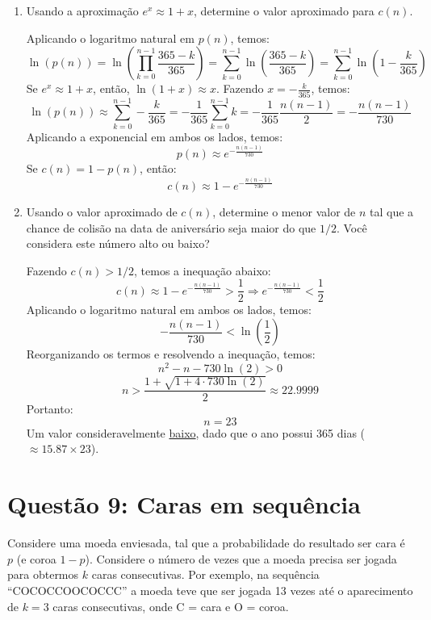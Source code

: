 \documentclass[12 pt]{article}
\begin{document}
\begin{enumerate}
\begin{tcolorbox}[colframe=black, title=Resposta:]
    \end{tcolorbox}
    \newpage
    \item Usando a aproximação $e^x \approx 1 + x$, determine o valor aproximado para $c(n)$.
    \begin{tcolorbox}[colframe=black, title=Resposta:]
        Aplicando o logaritmo natural em $p(n)$, temos:
        $$\ln(p(n)) = \ln\left(\prod _{k=0}^{n-1} \frac{365-k}{365}\right) = \sum _{k=0}^{n-1} \ln\left(\frac{365-k}{365}\right) = \sum _{k=0}^{n-1} \ln\left(1 - \frac{k}{365}\right)$$
        Se $e^x \approx 1 + x$, então, $\ln(1 + x) \approx x$. Fazendo $x=-\frac{k}{365}$, temos:
        $$\ln(p(n)) \approx \sum _{k=0}^{n-1} -\frac{k}{365} = -\frac{1}{365} \sum _{k=0}^{n-1} k = -\frac{1}{365}\frac{n(n-1)}{2} = -\frac{n(n-1)}{730}$$
        Aplicando a exponencial em ambos os lados, temos:
        $$p(n) \approx e^{-\frac{n(n-1)}{730}}$$
        Se $c(n) = 1 - p(n)$, então:
        $$\boxed{c(n) \approx 1 - e^{-\frac{n(n-1)}{730}}}$$
    \end{tcolorbox}
    \item Usando o valor aproximado de $c(n)$, determine o menor valor de $n$ tal que a chance de colisão na data de aniversário seja maior do que $1/2$. Você considera este número alto ou baixo?
    \begin{tcolorbox}[colframe=black, title=Resposta:]
        Fazendo $c(n) > 1/2$, temos a inequação abaixo:
        $$ c(n) \approx 1 - e^{-\frac{n(n-1)}{730}} > \frac{1}{2} \Rightarrow e^{-\frac{n(n-1)}{730}} < \frac{1}{2}$$
        Aplicando o logaritmo natural em ambos os lados, temos:
        $$ -\frac{n(n-1)}{730} < \ln\left(\frac{1}{2}\right)$$
        Reorganizando os termos e resolvendo a inequação, temos:
        $$ n^2 - n - 730 \ln(2) > 0$$
        $$ n > \frac{1 + \sqrt{1 + 4 \cdot 730 \ln(2)}}{2} \approx 22.9999$$
        Portanto: 
        $$\boxed{n = 23}$$
        Um valor consideravelmente \underline{baixo}, dado que o ano possui 365 dias ($\approx 15.87 \times 23$).
    \end{tcolorbox}
\end{enumerate}

\section*{Questão 9: Caras em sequência}
Considere uma moeda enviesada, tal que a probabilidade do resultado ser cara é $p$ (e coroa $1 - p$).
Considere o número de vezes que a moeda precisa ser jogada para obtermos $k$ caras consecutivas. Por exemplo, na sequência ``COCOCCOOCOCCC'' a moeda teve que ser jogada 13 vezes até o aparecimento de $k = 3$ caras consecutivas, onde C = cara e O = coroa.
\end{document}
